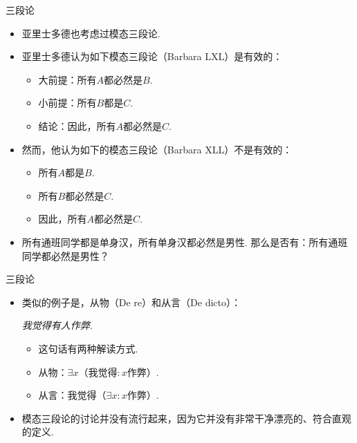     
    {三段论}
    \begin{itemize}
        \item 亚里士多德也考虑过模态三段论.
        \item 亚里士多德认为如下模态三段论（Barbara LXL）是有效的：%
        \begin{itemize}
            \item 大前提：所有$A$都必然是$B$.
            \item 小前提：所有$B$都是$C$.
            \item 结论：因此，所有$A$都必然是$C$.
        \end{itemize}
        \item 然而，他认为如下的模态三段论（Barbara XLL）不是有效的：
            \begin{itemize}
            \item 所有$A$都是$B$.
            \item 所有$B$都必然是$C$.
            \item 因此，所有$A$都必然是$C$.
        \end{itemize}
        \item 所有通班同学都是单身汉，所有单身汉都必然是男性. 那么是否有：所有通班同学都必然是男性？
    \end{itemize}
    
    
    {三段论}
    \begin{itemize}
        \item 类似的例子是，从物（De re）和从言（De dicto）：
            \begin{center}
            \it 我觉得有人作弊.
        \end{center}
        \begin{itemize}
            \item 这句话有两种解读方式.
            \item 从物：$\exists x$（我觉得$:x$作弊）.
            \item 从言：我觉得（$\exists x:x$作弊）.
        \end{itemize}
        \item 模态三段论的讨论并没有流行起来，因为它并没有非常干净漂亮的、符合直观的定义.
    \end{itemize}
    
